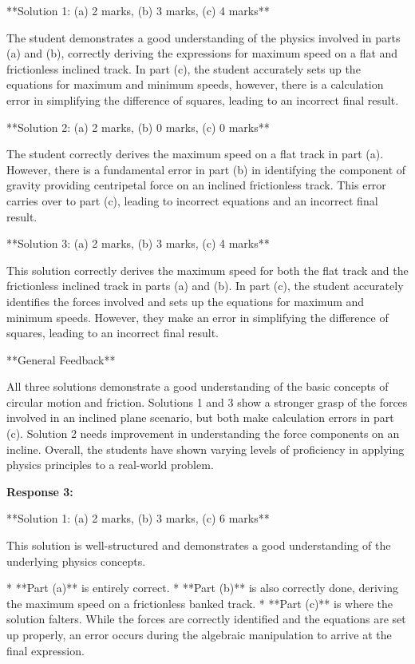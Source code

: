 \documentclass[a4paper,11pt]{article}
\begin{document}
**Solution 1: (a) 2 marks, (b) 3 marks, (c) 4 marks**

The student demonstrates a good understanding of the physics involved in parts (a) and (b), correctly deriving the expressions for maximum speed on a flat and frictionless inclined track. In part (c), the student accurately sets up the equations for maximum and minimum speeds, however, there is a calculation error in simplifying the difference of squares, leading to an incorrect final result.

**Solution 2: (a) 2 marks, (b) 0 marks, (c) 0 marks**

The student correctly derives the maximum speed on a flat track in part (a). However, there is a fundamental error in part (b) in identifying the component of gravity providing centripetal force on an inclined frictionless track. This error carries over to part (c), leading to incorrect equations and an incorrect final result.

**Solution 3: (a) 2 marks, (b) 3 marks, (c) 4 marks**

This solution correctly derives the maximum speed for both the flat track and the frictionless inclined track in parts (a) and (b). In part (c), the student accurately identifies the forces involved and sets up the equations for maximum and minimum speeds. However, they make an error in simplifying the difference of squares, leading to an incorrect final result.

**General Feedback**

All three solutions demonstrate a good understanding of the basic concepts of circular motion and friction. Solutions 1 and 3 show a stronger grasp of the forces involved in an inclined plane scenario, but both make calculation errors in part (c). Solution 2 needs improvement in understanding the force components on an incline. Overall, the students have shown varying levels of proficiency in applying physics principles to a real-world problem.

\bigskip    
\textbf{Response 3:}

**Solution 1: (a) 2 marks, (b) 3 marks, (c) 6 marks**

This solution is well-structured and demonstrates a good understanding of the underlying physics concepts.

*   **Part (a)** is entirely correct.
*   **Part (b)** is also correctly done, deriving the maximum speed on a frictionless banked track.
*   **Part (c)** is where the solution falters. While the forces are correctly identified and the equations are set up properly, an error occurs during the algebraic manipulation to arrive at the final expression.
\end{document}
